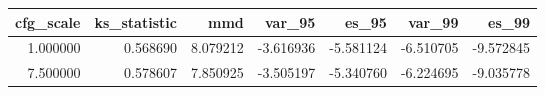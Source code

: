 \begin{tabular}{rrrrrrr}
\toprule
cfg_scale & ks_statistic & mmd & var_95 & es_95 & var_99 & es_99 \\
\midrule
1.000000 & 0.568690 & 8.079212 & -3.616936 & -5.581124 & -6.510705 & -9.572845 \\
7.500000 & 0.578607 & 7.850925 & -3.505197 & -5.340760 & -6.224695 & -9.035778 \\
\bottomrule
\end{tabular}
